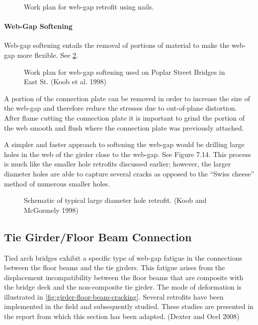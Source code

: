 \begin{figure}
  \caption{Work plan for web-gap retrofit using nails.}
  \label{fig:web-gap-retrofit-nails}
\end{figure}

\paragraph{Web-Gap Softening}
Web-gap softening entails the removal of portions of material to make the web-gap more flexible. See \cref{fig:web-gap-softening}.

\begin{figure}
  \caption{ Work plan for web-gap softening used on Poplar Street Bridges in East St. (Koob et al. 1998)}
  \label{fig:web-gap-softening}
\end{figure}

A portion of the connection plate can be removed in order to increase the size of the web-gap and therefore
reduce the stresses due to out-of-plane distortion. After flame cutting the connection plate it is important to grind the
portion of the web smooth and flush where the connection plate was previously attached.

A simpler and faster approach to softening the web-gap would be drilling large holes in the web of the girder
close to the web-gap. See Figure 7.14. This process is much like the smaller hole retrofits discussed earlier; however,
the larger diameter holes are able to capture several cracks as opposed to the “Swiss cheese” method of numerous
smaller holes.

\begin{figure}
  \caption{Schematic of typical large diameter hole retrofit. (Koob and McGormely 1998)}
  \label{fig:large-diameter-hole-retrofit}
\end{figure}

\subsection{Tie Girder/Floor Beam Connection}
Tied arch bridges exhibit a specific type of web-gap fatigue in the connections between the floor beams and the
tie girders. This fatigue arises from the displacement incompatibility between the floor beams that are composite
with the bridge deck and the non-composite tie girder. The mode of deformation is illustrated in \cref{fig:girder-floor-beam-cracking}.
Several retrofits have been implemented in the field and subsequently studied. These studies are presented in the
report from which this section has been adapted. (Dexter and Ocel 2008)

